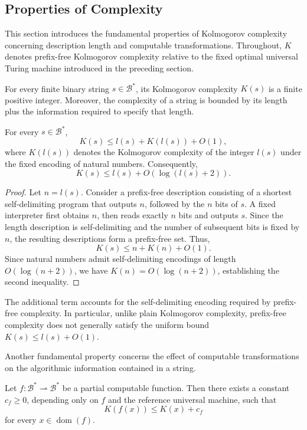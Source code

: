 
\subsection*{Properties of Complexity}
\label{sec:properties_complexity}

This section introduces the fundamental properties of Kolmogorov complexity concerning description length and computable transformations. Throughout, $K$ denotes prefix-free Kolmogorov complexity relative to the fixed optimal universal Turing machine introduced in the preceding section.

For every finite binary string $s \in \mathcal{B}^*$, its Kolmogorov complexity $K(s)$ is a finite positive integer. Moreover, the complexity of a string is bounded by its length plus the information required to specify that length.

\begin{proposition}
\label{prop:kolmogorov_length}
For every $s \in \mathcal{B}^*$,
\[
K(s) \leq l(s) + K(l(s)) + O(1),
\]
where $K(l(s))$ denotes the Kolmogorov complexity of the integer $l(s)$ under the fixed encoding of natural numbers. Consequently,
\[
K(s) \leq l(s) + O(\log(l(s)+2)).
\]
\end{proposition}

\begin{proof}
Let $n=l(s)$. Consider a prefix-free description consisting of a shortest self-delimiting program that outputs $n$, followed by the $n$ bits of $s$. A fixed interpreter first obtains $n$, then reads exactly $n$ bits and outputs $s$. Since the length description is self-delimiting and the number of subsequent bits is fixed by $n$, the resulting descriptions form a prefix-free set. Thus,
\[
K(s) \leq n + K(n) + O(1).
\]
Since natural numbers admit self-delimiting encodings of length $O(\log(n+2))$, we have $K(n)=O(\log(n+2))$, establishing the second inequality.
\end{proof}

The additional term accounts for the self-delimiting encoding required by prefix-free complexity. In particular, unlike plain Kolmogorov complexity, prefix-free complexity does not generally satisfy the uniform bound $K(s)\leq l(s)+O(1)$.

Another fundamental property concerns the effect of computable transformations on the algorithmic information contained in a string.

\begin{proposition}
\label{prop:computable-transformation}
Let $f:\mathcal{B}^*\rightharpoonup\mathcal{B}^*$ be a partial computable function. Then there exists a constant $c_f\geq 0$, depending only on $f$ and the reference universal machine, such that
\[
K(f(x)) \leq K(x) + c_f
\]
for every $x\in\operatorname{dom}(f)$.
\end{proposition}

